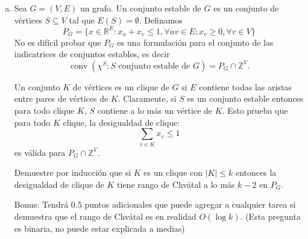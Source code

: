 \documentclass{article}
\newcommand{\RR}{\mathbb R}
\newcommand{\ZZ}{\mathbb Z}
\newcommand{\conv}{\operatorname{conv}}
\theoremstyle{plain}
\theoremstyle{definition}
\theoremstyle{Azul}
\begin{document}
\begin{enumerate}[(a)]
\item Sea $G=(V,E)$ un grafo. Un conjunto estable de $G$ es un conjunto de vértices $S\subseteq V$ tal que $E(S)=\emptyset$. Definamos 
$$P_G=\{x\in \RR^E\colon x_u+x_v\leq 1, \forall uv\in E; x_v\geq 0, \forall v\in V\}$$
No es difícil probar que $P_G$ es una formulación para el conjunto de las indicatrices de conjuntos estables, es decir
$$\conv(\chi^S\colon S\text{ conjunto estable de $G$})=P_G\cap \ZZ^V.$$

Un conjunto $K$ de vértices es un clique de $G$ si $E$ contiene todas las aristas entre pares de vértices de $K$. Claramente, si $S$ es un conjunto estable entonces para todo clique $K$, $S$ contiene a lo más un vértice de $K$. Esto prueba que para todo $K$ clique, la desigualdad de clique:
$$\sum_{v\in K}x_v \leq 1$$
es válida para $P_G\cap \ZZ^V$.

Demuestre por inducción que si $K$ es un clique con $|K|\leq k$ entonces la desigualdad de clique de $K$ tiene rango de Chvátal a lo más $k-2$ en $P_G$.

Bonus: Tendrá 0.5 puntos adicionales que puede agregar a cualquier tarea si demuestra que el rango de Chvátal es en realidad $O(\log k)$. (Esta pregunta es binaria, no puede estar explicada a medias)
\end{enumerate}



	
\end{document}
